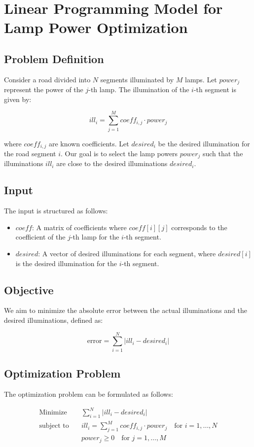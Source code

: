 \documentclass{article}
\begin{document}
\section*{Linear Programming Model for Lamp Power Optimization}

\subsection*{Problem Definition}
Consider a road divided into \(N\) segments illuminated by \(M\) lamps. Let \(power_j\) represent the power of the \(j\)-th lamp. The illumination of the \(i\)-th segment is given by:

\[
ill_i = \sum_{j=1}^{M} coeff_{i,j} \cdot power_j
\]

where \(coeff_{i,j}\) are known coefficients. Let \(desired_i\) be the desired illumination for the road segment \(i\). Our goal is to select the lamp powers \(power_j\) such that the illuminations \(ill_i\) are close to the desired illuminations \(desired_i\).

\subsection*{Input}
The input is structured as follows:

\begin{itemize}
    \item \(coeff\): A matrix of coefficients where \(coeff[i][j]\) corresponds to the coefficient of the \(j\)-th lamp for the \(i\)-th segment.
    \item \(desired\): A vector of desired illuminations for each segment, where \(desired[i]\) is the desired illumination for the \(i\)-th segment.
\end{itemize}

\subsection*{Objective}
We aim to minimize the absolute error between the actual illuminations and the desired illuminations, defined as:

\[
\text{error} = \sum_{i=1}^{N} |ill_i - desired_i|
\]

\subsection*{Optimization Problem}
The optimization problem can be formulated as follows:

\begin{align*}
\text{Minimize} & \quad \sum_{i=1}^{N} |ill_i - desired_i| \\
\text{subject to} & \quad ill_i = \sum_{j=1}^{M} coeff_{i,j} \cdot power_j \quad \text{for } i = 1, \ldots, N \\
& \quad power_j \geq 0 \quad \text{for } j = 1, \ldots, M
\end{align*}
\end{document}
